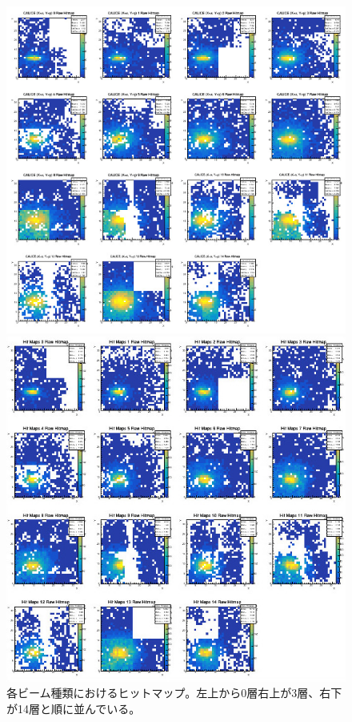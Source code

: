\begin{figure}[H]
\begin{minipage}[b]{0.45\linewidth}
  \end{minipage}
  \begin{minipage}[b]{0.45\linewidth}
    \centering
    \includegraphics[keepaspectratio, scale=0.5]{Figure/Beamtest/hitmap_mu150.png}
   \end{minipage}
  \begin{minipage}[b]{0.45\linewidth}
    \centering
    \includegraphics[keepaspectratio, scale=0.25]{Figure/Beamtest/hitmap_pi150.png}
  \end{minipage}
  \caption{各ビーム種類におけるヒットマップ。左上から0層右上が3層、右下が14層と順に並んでいる。}
  \label{hitmap}
\end{figure}
